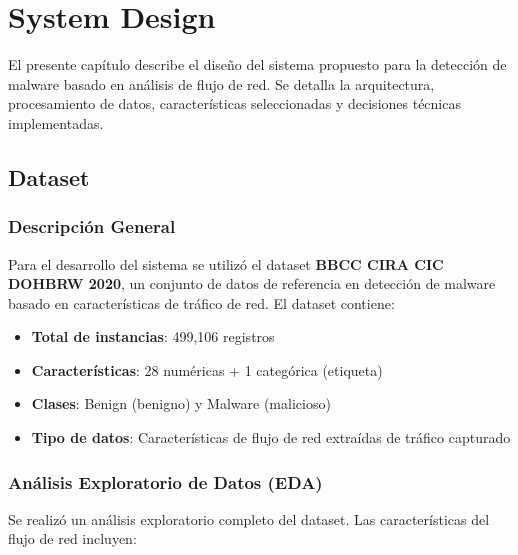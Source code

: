 \chapter{System Design}\label{ch:system_design}

El presente capítulo describe el diseño del sistema propuesto para la detección de malware basado en análisis de flujo de red. Se detalla la arquitectura, procesamiento de datos, características seleccionadas y decisiones técnicas implementadas.

\section{Dataset}\label{sec:dataset}

\subsection{Descripción General}

Para el desarrollo del sistema se utilizó el dataset \textbf{BBCC CIRA CIC DOHBRW 2020}, un conjunto de datos de referencia en detección de malware basado en características de tráfico de red. El dataset contiene:

\begin{itemize}
    \item \textbf{Total de instancias}: 499,106 registros
    \item \textbf{Características}: 28 numéricas + 1 categórica (etiqueta)
    \item \textbf{Clases}: Benign (benigno) y Malware (malicioso)
    \item \textbf{Tipo de datos}: Características de flujo de red extraídas de tráfico capturado
\end{itemize}

\subsection{Análisis Exploratorio de Datos (EDA)}

Se realizó un análisis exploratorio completo del dataset. Las características del flujo de red incluyen:

